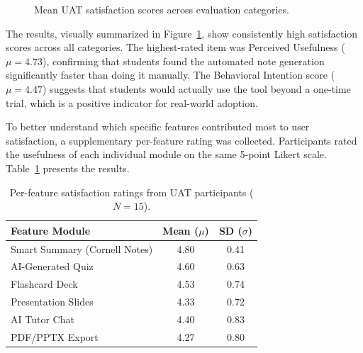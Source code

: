 \begin{figure}[htbp]
\centering
{}
\caption{Mean UAT satisfaction scores across evaluation categories.}
\label{fig:uat_barchart}
\end{figure}

The results, visually summarized in Figure~\ref{fig:uat_barchart}, show consistently high satisfaction scores across all categories. The highest-rated item was Perceived Usefulness ($\mu = 4.73$), confirming that students found the automated note generation significantly faster than doing it manually. The Behavioral Intention score ($\mu = 4.47$) suggests that students would actually use the tool beyond a one-time trial, which is a positive indicator for real-world adoption.

To better understand which specific features contributed most to user satisfaction, a supplementary per-feature rating was collected. Participants rated the usefulness of each individual module on the same 5-point Likert scale. Table~\ref{tab:feature_satisfaction} presents the results.

\begin{table}[htbp]
\centering
\begin{tabular}{|l|c|c|}
\hline
\textbf{Feature Module} & \textbf{Mean ($\mu$)} & \textbf{SD ($\sigma$)} \\ \hline
Smart Summary (Cornell Notes) & 4.80 & 0.41 \\ \hline
AI-Generated Quiz & 4.60 & 0.63 \\ \hline
Flashcard Deck & 4.53 & 0.74 \\ \hline
Presentation Slides & 4.33 & 0.72 \\ \hline
AI Tutor Chat & 4.40 & 0.83 \\ \hline
PDF/PPTX Export & 4.27 & 0.80 \\ \hline
\end{tabular}
\vspace{6pt}
\caption{Per-feature satisfaction ratings from UAT participants ($N=15$).}
\label{tab:feature_satisfaction}
\end{table}


